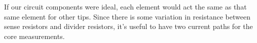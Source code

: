 If our circuit components were ideal, each element would act the same as that same element for other tips. Since there is some variation in resistance between sense resistors and divider resistors, it's useful to have two current paths for the core measurements.











